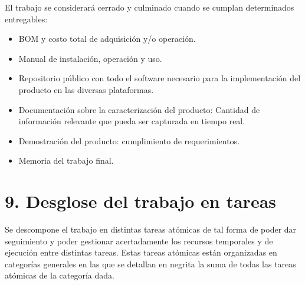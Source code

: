 \documentclass[
11pt, %
codirector, %
]{charter}
\begin{document}
El trabajo se considerará cerrado y culminado cuando se cumplan determinados entregables:

\begin{itemize}
	\item BOM y costo total de adquisición y/o operación.
	\item Manual de instalación, operación y uso.
	\item Repositorio público con todo el software necesario para la implementación del producto en las diversas plataformas.
	\item Documentación sobre la caracterización del producto: Cantidad de información relevante que pueda ser capturada en tiempo real.
	\item Demostración del producto: cumplimiento de requerimientos.
	\item Memoria del trabajo final.
\end{itemize}


\section{9. Desglose del trabajo en tareas}
\label{sec:wbs}

Se descompone el trabajo en distintas tareas atómicas de tal forma de poder dar seguimiento y poder gestionar acertadamente los recursos temporales y de ejecución entre distintas tareas. Estas tareas atómicas están organizadas en categorías generales en las que se detallan en negrita la suma de todas las tareas atómicas de la categoría dada.
\end{document}
